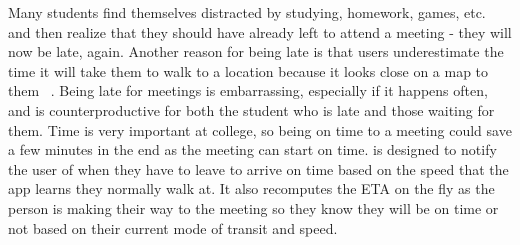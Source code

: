 Many students find themselves distracted by studying, homework, games, etc. and then realize that they should have already left to attend a meeting - they will now be late, again. Another reason for being late is that users underestimate the time it will take them to walk to a location because it looks close on a map to them ~\cite{raghubir1996crow}. Being late for meetings is embarrassing, especially if it happens often, and is counterproductive for both the student who is late and those waiting for them. Time is very important at college, so being on time to a meeting could save a few minutes in the end as the meeting can start on time.  is designed to notify the user of when they have to leave to arrive on time based on the speed that the app learns they normally walk at. It also recomputes the ETA on the fly as the person is making their way to the meeting so they know they will be on time or not based on their current mode of transit and speed.